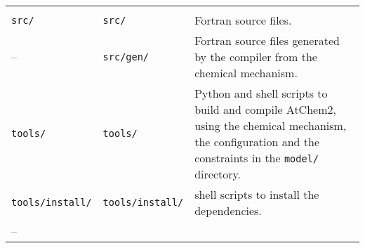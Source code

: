 \begin{longtable}[]{@{}lll@{}}
\begin{minipage}[t]{0.48\columnwidth}
\end{minipage}\tabularnewline
\begin{minipage}[t]{0.20\columnwidth}\raggedright
\texttt{src/}\strut
\end{minipage} & \begin{minipage}[t]{0.24\columnwidth}\raggedright
\texttt{src/}\strut
\end{minipage} & \begin{minipage}[t]{0.48\columnwidth}\raggedright
Fortran source files.\strut
\end{minipage}\tabularnewline
\begin{minipage}[t]{0.20\columnwidth}\raggedright
--\strut
\end{minipage} & \begin{minipage}[t]{0.24\columnwidth}\raggedright
\texttt{src/gen/}\strut
\end{minipage} & \begin{minipage}[t]{0.48\columnwidth}\raggedright
Fortran source files generated by the compiler from the chemical
mechanism.\strut
\end{minipage}\tabularnewline
\begin{minipage}[t]{0.20\columnwidth}\raggedright
\texttt{tools/}\strut
\end{minipage} & \begin{minipage}[t]{0.24\columnwidth}\raggedright
\texttt{tools/}\strut
\end{minipage} & \begin{minipage}[t]{0.48\columnwidth}\raggedright
Python and shell scripts to build and compile AtChem2, using the
chemical mechanism, the configuration and the constraints in the
\texttt{model/} directory.\strut
\end{minipage}\tabularnewline
\begin{minipage}[t]{0.20\columnwidth}\raggedright
\texttt{tools/install/}\strut
\end{minipage} & \begin{minipage}[t]{0.24\columnwidth}\raggedright
\texttt{tools/install/}\strut
\end{minipage} & \begin{minipage}[t]{0.48\columnwidth}\raggedright
shell scripts to install the dependencies.\strut
\end{minipage}\tabularnewline
\begin{minipage}[t]{0.20\columnwidth}\raggedright
--\strut
\end{minipage} & \begin{minipage}[t]{0.24\columnwidth}\raggedright

\end{minipage}
\end{longtable}
